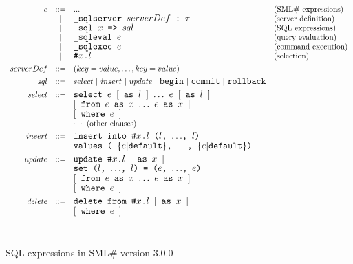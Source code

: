 \documentclass{jbook}
\newcommand{\txt}[2]{#2}
\newcommand{\smlsharp}{SML\#}
\newcommand{\version}{3.0.0}
\newcommand{\code}[1]{\mbox{\large\tt #1}}
\newcommand{\vbar}{\mbox{\ $|$\ }}
\begin{document}
\begin{figure}
\begin{center}
\[
\begin{array}{rcll}
  e &::=& ... & \mbox{(\smlsharp{} expressions)}
\\  &|& \code{\_sqlserver $serverDef$~:~$\tau$} 
	& \mbox{(server definition)}
\\  &|& \code{\_sql $x$ => $sql$} 
	& \mbox{(SQL expressions)}
\\  &|& \code{\_sqleval $e$}
	& \mbox{(query evaluation)}
\\  &|& \code{\_sqlexec $e$}
	& \mbox{(command execution)}
\\  &|& \code{\#$x$.$l$}
	& \mbox{(selection)}
\\[1ex]
serverDef &::=& (key = value,\ldots,key = value)
\\[1ex]
  sql &::=& select
\vbar insert
\vbar update
\vbar \code{begin}
\vbar \code{commit}
\vbar \code{rollback}
\\[1ex]
select &::=& 
     \code{select $e$ $[$ as $l$ $]$ $\ldots$ $e$ $[$ as $l$ $]$}
\\&& \code{$[$ from $e$ as $x$ $\ldots$ $e$ as $x$ $]$}
\\&& \code{$[$ where $e$ $]$}
\\&& \cdots\ \mbox{(other clauses)}
\\[1ex]
insert &::=& 
\code{insert into \#$x$.$l$ ($l$, $\ldots$, $l$)}
\\&& \code{values ( $\{e|$default$\}$, $\ldots$, $\{e|$default$\}$)}
\\[1ex]
update &::=& 
   \code{update \#$x$.$l$ $[$ as $x$ $]$}
\\&& \code{set ($l$, $\ldots$, $l$) = ($e$, $\ldots$, $e$)}
\\&& \code{$[$ from $e$ as $x$ $\ldots$ $e$ as $x$ $]$}
\\&& \code{$[$ where $e$ $]$}
\\[1ex]
delete &::=& 
   \code{delete from \#$x$.$l$ $[$ as $x$ $]$}
\\&& \code{$[$ where $e$ $]$}
\end{array}
\]
\ \\
\caption{\txt{\smlsharp{}第\version{}版のSQL構文概要}{SQL expressions in \smlsharp{} version \version{}}}
\end{center}
\label{fig:sqlSyntax}
\end{figure}
\end{document}
